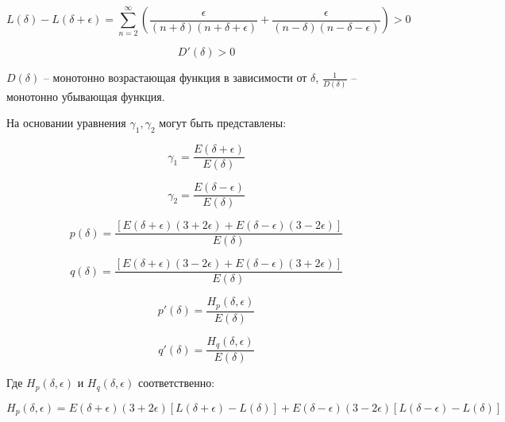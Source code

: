 \begin{equation}
	\label{eq:equation77}
	L(\delta) - L(\delta + \epsilon) = \sum_{n=2}^{\infty} \left(  \frac{\epsilon}{(n + \delta)(n + \delta + \epsilon)} + \frac{\epsilon}{(n - \delta)(n - \delta - \epsilon)} \right) > 0
\end{equation}

\begin{equation}
	\label{eq:equation78}
	D'(\delta) > 0 
\end{equation}

$D(\delta)$ -- монотонно возрастающая функция в зависимости от $\delta$, $\frac{1}{D(\delta)}$ -- монотонно убывающая функция. 

На основании уравнения  $\gamma_1, \gamma_2$ могут быть представлены:

\begin{equation}
	\label{eq:equation79}
	\gamma_1 = \frac{E(\delta + \epsilon)}{E(\delta)} 
\end{equation}

\begin{equation}
	\label{eq:equation80}
	\gamma_2 = \frac{E(\delta - \epsilon)}{E(\delta)} 
\end{equation}

\begin{equation}
	\label{eq:equation81}
	p(\delta) = \frac{[E(\delta + \epsilon)(3 + 2 \epsilon) + E(\delta - \epsilon)(3 - 2 \epsilon)]}{E(\delta)}
\end{equation}

\begin{equation}
	\label{eq:equation82}
	q(\delta) = \frac{[E(\delta + \epsilon)(3 - 2 \epsilon) + E(\delta - \epsilon)(3 + 2 \epsilon)]}{E(\delta)}
\end{equation}

\begin{equation}
	\label{eq:equation83}
	p'(\delta) = \frac{H_{p}(\delta, \epsilon)}{E(\delta)}
\end{equation}

\begin{equation}
	\label{eq:equation84}
	q'(\delta) = \frac{H_{q}(\delta, \epsilon)}{E(\delta)}
\end{equation}

Где $H_{p}(\delta, \epsilon)$ и $H_{q}(\delta, \epsilon)$ соответственно:

\begin{equation}
	\label{eq:equation85}
	H_{p}(\delta, \epsilon) = E(\delta + \epsilon)(3 + 2 \epsilon) [L (\delta + \epsilon) - L(\delta)] + E(\delta - \epsilon)(3 - 2\epsilon) [L(\delta - \epsilon) - L(\delta)]
\end{equation}


